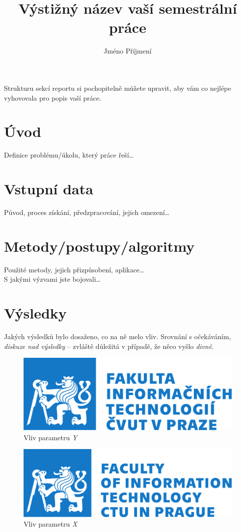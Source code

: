 \documentclass[czech]{pyt-report}
\title{Výstižný název vaší semestrální práce}
\author{Jméno Příjmení}
\affiliation{ČVUT--FIT}
\begin{document}
\maketitle

Strukturu sekcí reportu si pochopitelně můžete upravit, aby vám co nejlépe vyhovovala pro popis vaší práce.

\section{Úvod}
Definice problému/úkolu, který práce řeší\ldots


\section{Vstupní data}
Původ, proces získání, předzpracování, jejich omezení\ldots

\section{Metody/postupy/algoritmy}
Použité metody, jejich přizpůsobení, aplikace\ldots \\
S jakými výzvami jste bojovali\ldots

\section{Výsledky}

Jakých výsledků bylo dosaženo, co na ně melo vliv. Srovnání s očekáváním, \emph{diskuze nad výsledky} -- zvláště důležitá v případě, že něco vyšlo \emph{divně}.

\begin{figure}[h]
  \centering\leavevmode
  \includegraphics[width=.45\linewidth]{img/fit-logo-cz.pdf}\vskip-0.5cm
  \caption{Vliv parametru \emph{Y}}
  \label{fig:par-y}
\end{figure}
\begin{figure}[h]
  \centering\leavevmode
  \includegraphics[width=.45\linewidth]{img/fit-logo-en.pdf}\vskip-0.5cm
  \caption{Vliv parametru \emph{X}}
  \label{fig:par-x}
\end{figure}
\end{document}
